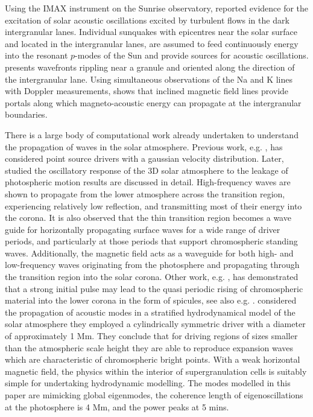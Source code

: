 \documentclass[preprint,authoryear,12pt]{elsarticle}
\begin{document}
Using the IMAX instrument on the Sunrise observatory, \citet{Roth2010}  reported evidence for the excitation of solar acoustic oscillations excited by turbulent flows  in the dark intergranular lanes.  Individual sunquakes with epicentres near the solar surface and located in the intergranular lanes, are assumed to feed continuously energy into the resonant $p$-modes of the Sun and provide sources for acoustic oscillations. \citet{Roth2010} presents wavefronts rippling near a granule and oriented along the direction of the intergranular lane. Using simultaneous observations of the Na and K lines with Doppler measurements, \citet{Jefferies2006} shows that inclined magnetic field lines provide portals along which magneto-acoustic energy can propagate at the intergranular boundaries.

There is a large body of computational work already undertaken to understand the propagation of waves in the solar atmosphere. Previous work, e.g. \citet{Erdelyi2007}, has considered point source drivers with a gaussian velocity distribution. Later, \citet{Fedun2009} studied the oscillatory response of the 3D solar atmosphere to the leakage of photospheric motion results are discussed in detail. High-frequency waves are shown to propagate from the lower atmosphere across the transition region, experiencing relatively low reflection, and transmitting most of their energy into the corona. It is also observed that the thin transition region becomes a wave guide for horizontally propagating surface waves for a wide range of driver periods, and particularly at those periods that support chromospheric standing waves. Additionally, the magnetic field acts as a waveguide for both high- and low-frequency waves originating from the photosphere and propagating through the transition region into the solar corona.  Other work, e.g.  \citet{Murawski2010}, has demonstrated that a strong initial pulse may lead to the quasi periodic rising of chromospheric material into the lower corona in the form of spicules, see also e.g. \citet{Khomenko2013}. \citet{Kalkofen2010} considered the propagation of acoustic modes in a stratified hydrodynamical model of the solar atmosphere they employed a cylindrically symmetric driver with a diameter of approximately 1 Mm. They conclude that for driving regions of sizes smaller than the atmospheric scale height they are able to reproduce expansion waves which are characteristic of chromospheric bright points. With a weak horizontal magnetic field, the physics within the interior of supergranulation cells \citet{Lites2008} is suitably simple for undertaking hydrodynamic modelling. The modes modelled in this paper are mimicking global eigenmodes, the coherence length of eigenoscillations at the photosphere is 4 Mm, and the power peaks at 5 mins. 
\end{document}
